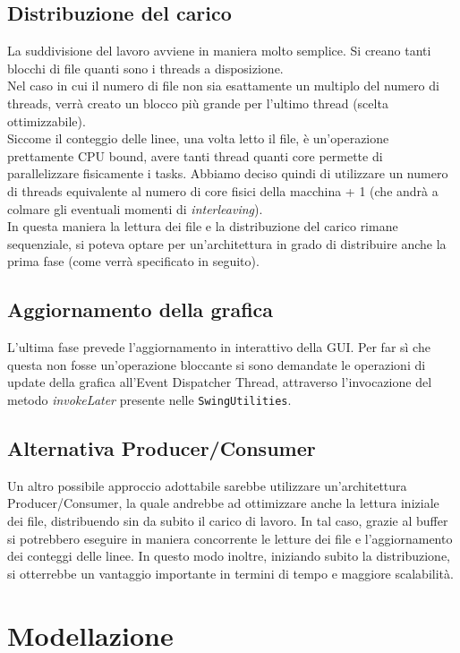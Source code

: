 \documentclass{article}
\begin{document}
\subsection{Distribuzione del carico}
La suddivisione del lavoro avviene in maniera molto semplice. Si creano tanti blocchi di file quanti sono i threads a disposizione.
\\
Nel caso in cui il numero di file non sia esattamente un multiplo del numero di threads, verrà creato un blocco più grande per l’ultimo thread (scelta ottimizzabile).
\\
Siccome il conteggio delle linee, una volta letto il file, è un'operazione prettamente CPU bound, avere tanti thread quanti core permette di parallelizzare fisicamente i tasks. Abbiamo deciso quindi di utilizzare un numero di threads equivalente al numero di core fisici della macchina + 1 (che andrà a colmare gli eventuali momenti  di \textit{interleaving}). 
\\
In questa maniera la lettura dei file e la distribuzione del carico rimane sequenziale, si poteva optare per un'architettura in grado di distribuire anche la prima fase (come verrà specificato in seguito).


\subsection{Aggiornamento della grafica}
L’ultima fase prevede l’aggiornamento in interattivo della GUI. Per far sì che questa non fosse un’operazione bloccante si sono demandate le operazioni di update della grafica all’Event Dispatcher Thread, attraverso l’invocazione del metodo \textit{invokeLater} presente nelle \texttt{SwingUtilities}.


\subsection*{Alternativa Producer/Consumer}
Un altro possibile approccio adottabile sarebbe utilizzare un’architettura Producer/Consumer, la quale andrebbe ad ottimizzare anche la lettura iniziale dei file, distribuendo sin da subito il carico di lavoro. In tal caso, grazie al buffer si potrebbero eseguire in maniera concorrente le letture dei file e l’aggiornamento dei conteggi delle linee. In questo modo inoltre, iniziando subito la distribuzione, si otterrebbe un vantaggio importante in termini di tempo e maggiore scalabilità.


\section{Modellazione}
\end{document}

